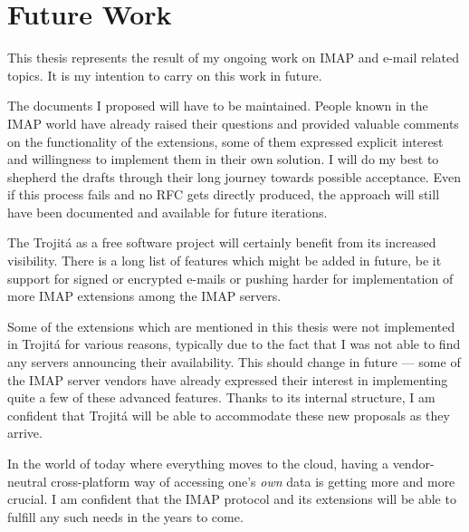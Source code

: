 \documentclass[trojita]{subfiles}
\begin{document}
\section{Future Work}
\label{sec:future-work}

This thesis represents the result of my ongoing work on IMAP and e-mail related topics.  It is my intention to carry on
this work in future.

The documents I proposed will have to be maintained.  People known in the IMAP world have already raised their questions
and provided valuable comments on the functionality of the extensions, some of them expressed explicit interest and
willingness to implement them in their own solution.  I will do my best to shepherd the drafts through their long
journey towards possible acceptance.  Even if this process fails and no RFC gets directly produced, the approach will
still have been documented and available for future iterations.

The Trojitá as a free software project will certainly benefit from its increased visibility.  There is a long list of
features which might be added in future, be it support for signed or encrypted e-mails or pushing harder for
implementation of more IMAP extensions among the IMAP servers.

Some of the extensions which are mentioned in this thesis were not implemented in Trojitá for various reasons, typically
due to the fact that I was not able to find any servers announcing their availability.  This should change in future ---
some of the IMAP server vendors have already expressed their interest in implementing quite a few of these advanced
features.  Thanks to its internal structure, I am confident that Trojitá will be able to accommodate these new proposals
as they arrive.

In the world of today where everything moves to the cloud, having a vendor-neutral cross-platform way of accessing one's
{\em own} data is getting more and more crucial.  I am confident that the IMAP protocol and its extensions will be able
to fulfill any such needs in the years to come.
\end{document}

